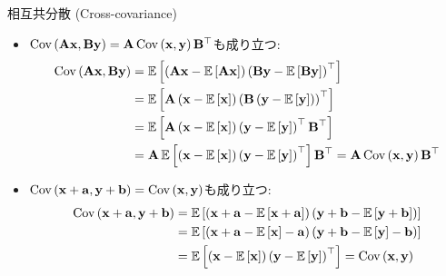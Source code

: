 \documentclass[dvipdfmx,notheorems,t]{beamer}
\begin{document}
\begin{frame}{相互共分散 (Cross-covariance)}
\begin{itemize}
  \item $\Cov{\vb{A} \vb{x}}{\vb{B} \vb{y}} = \vb{A} \Cov{\vb{x}}{\vb{y}} \vb{B}^\top$も成り立つ:
  {\small \begin{align*}
    \Cov{\vb{A} \vb{x}}{\vb{B} \vb{y}}
    &= \E{\left( \vb{A} \vb{x} - \E{\vb{A} \vb{x}} \right)
      \left( \vb{B} \vb{y} - \E{\vb{B} \vb{y}} \right)^\top} \\
    &= \E{\vb{A} \left( \vb{x} - \E{\vb{x}} \right)
      \left( \vb{B} \left( \vb{y} - \E{\vb{y}} \right) \right)^\top} \\
    &= \E{\vb{A} \left( \vb{x} - \E{\vb{x}} \right)
      \left( \vb{y} - \E{\vb{y}} \right)^\top \vb{B}^\top} \\
    &= \vb{A} \E{\left( \vb{x} - \E{\vb{x}} \right)
      \left( \vb{y} - \E{\vb{y}} \right)^\top} \vb{B}^\top
    = \vb{A} \Cov{\vb{x}}{\vb{y}} \vb{B}^\top
  \end{align*}}
  \item $\Cov{\vb{x} + \vb{a}}{\vb{y} + \vb{b}} = \Cov{\vb{x}}{\vb{y}}$も成り立つ:
  \begin{align*}
    \Cov{\vb{x} + \vb{a}}{\vb{y} + \vb{b}}
    &= \E{\left( \vb{x} + \vb{a} - \E{\vb{x} + \vb{a}} \right)
      \left( \vb{y} + \vb{b} - \E{\vb{y} + \vb{b}} \right)} \\
    &= \E{\left( \vb{x} + \vb{a} - \E{\vb{x}} - \vb{a} \right)
      \left( \vb{y} + \vb{b} - \E{\vb{y}} - \vb{b} \right)} \\
    &= \E{\left( \vb{x} - \E{\vb{x}} \right)
      \left( \vb{y} - \E{\vb{y}} \right)^\top} = \Cov{\vb{x}}{\vb{y}}
  \end{align*}
\end{itemize}
\end{frame}
\end{document}
